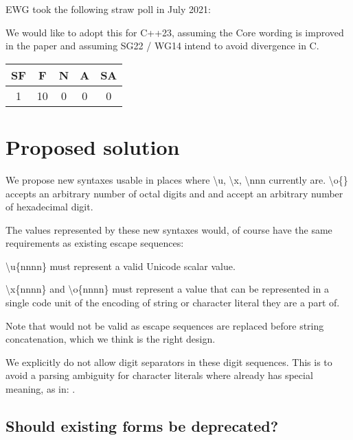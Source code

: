 \documentclass{wg21}
\begin{document}
EWG took the following straw poll in July 2021:

\begin{quoteblock}
We would like to adopt this for C++23, assuming the Core wording is improved in the paper and assuming SG22 / WG14 intend to avoid divergence in C.

\begin{tabular}{|c|c|c|c|c|}
    \hline
    SF & F & N & A & SA \\
    \hline
    1 & 10 & 0 & 0 & 0 \\
    \hline
\end{tabular}

\end{quoteblock}


\section{Proposed solution}

We propose new syntaxes  usable in places where
\textbackslash u, \textbackslash x, \textbackslash nnn currently are.
\textbackslash o\{\} accepts an arbitrary number of octal digits and  and  accept
an arbitrary number of hexadecimal digit.

The values represented by these new syntaxes would, of course have the same requirements as existing escape sequences:

\textbackslash u\{nnnn\} must represent a valid Unicode scalar value.

\textbackslash x\{nnnn\} and \textbackslash o\{nnnn\} must represent a value that can be represented in a single code unit of the encoding of string or character literal they are a part of.

Note that  would not be valid as escape sequences are replaced before string concatenation, which we think is the right design.


We explicitly do not allow digit separators in these digit sequences. This is to avoid a parsing ambiguity for character literals where  already has special meaning, as in: .


\subsection{Should existing forms be deprecated?}
\end{document}
